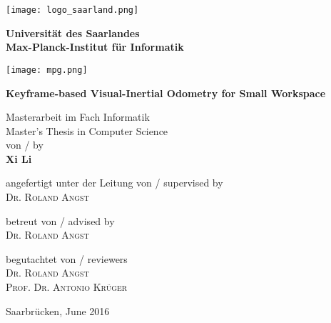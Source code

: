 \noindent
\begin{titlepage}
\texttt{[image: logo\_saarland.png]}
\hfill
\begin{minipage}{8cm}
\centering
\vspace{-1.5cm} 
\textbf{Universit\"at des Saarlandes \\ Max-Planck-Institut f\"ur Informatik}
\end{minipage}
\hfill
\texttt{[image: mpg.png]}
\vfill

\Large
\textbf{Keyframe-based Visual-Inertial Odometry for Small Workspace}
\vfill

\large
Masterarbeit im Fach Informatik \\
Master's Thesis in Computer Science \\
von / by \\
\textbf{Xi Li} \\
\vfill

angefertigt unter der Leitung von / supervised by \\
\large{\textsc{Dr. Roland Angst}}\\
\vfill

betreut von / advised by \\
\large{\textsc{Dr. Roland Angst}} \\
\vfill

begutachtet von / reviewers \\
\large{\textsc{Dr. Roland Angst \\ Prof. Dr. Antonio Kr{\"u}ger}} \\
\vfill

Saarbr\"ucken, June 2016
\end{titlepage}





